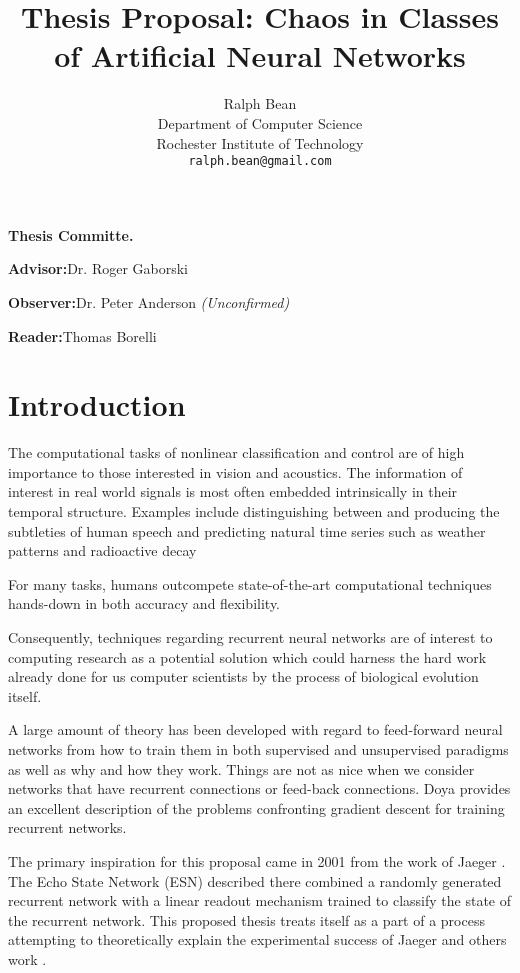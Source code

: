 \documentclass[12pt]{article}
\title{Thesis Proposal:  Chaos in Classes of Artificial Neural Networks}
\author{Ralph Bean\\
Department of Computer Science\\
Rochester Institute of Technology\\
\texttt{ralph.bean@gmail.com}}
\begin{document}
\maketitle
\vfill
\textbf{Thesis Committe.}

\textbf{Advisor:}\hspace{14pt}Dr. Roger Gaborski

\textbf{Observer:}\hspace{7pt}Dr. Peter Anderson \textit{(Unconfirmed)}

\textbf{Reader:}\hspace{18pt}Thomas Borelli


\newpage
\setcounter{secnumdepth}{3}

\tableofcontents
\newpage

\section{Introduction}
The computational tasks of nonlinear classification and control are of high
importance to those interested in vision and acoustics.  The information
of interest in real world signals is most often embedded intrinsically in
their temporal structure.  Examples include distinguishing between and
producing the subtleties of human speech and predicting natural time series 
such as weather patterns and radioactive decay \cite{verstraeten, weigend} 

For many tasks, humans outcompete state-of-the-art computational techniques
hands-down in both accuracy and flexibility.

Consequently, techniques regarding recurrent neural networks 
are of interest to computing research as a potential solution which could
harness the hard work already done for us computer scientists by the process
of biological evolution itself. 

A large amount of theory has been developed with regard to feed-forward
neural networks from how to train them in both supervised and unsupervised
paradigms as well as why and how they work.  Things are not as nice when
we consider networks that have recurrent connections or feed-back connections.
Doya \cite{doya} 
provides an excellent description of the problems confronting gradient
descent for training recurrent networks.

The primary inspiration for this proposal came in 2001 from the work of 
Jaeger \cite{jaeger_original}.  
The Echo State Network (ESN) described there combined
a randomly generated recurrent network with a linear readout mechanism trained
to classify the state of the recurrent network.  This proposed thesis treats
itself as a part of a process attempting to theoretically explain the
experimental success of Jaeger and others work \cite{maass_original}.
\end{document}
